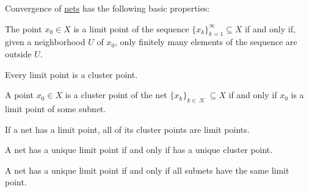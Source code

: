 \begin{proposition}\label{thm:net_convergence_properties}
  Convergence of \hyperref[def:net_convergence]{nets} has the following basic properties:

  \begin{thmenum}
     The point \( x_0 \in X \) is a limit point of the sequence \( \{ x_k \}_{k=1}^\infty \subseteq X \) if and only if, given a neighborhood \( U \) of \( x_0 \), only finitely many elements of the sequence are outside \( U \).

     Every limit point is a cluster point.

     A point \( x_0 \in X \) is a cluster point of the net \( \{ x_k \}_{k \in \mscrK} \subseteq X \) if and only if \( x_0 \) is a limit point of some subnet.

     If a net has a limit point, all of its cluster points are limit points.

     A net has a unique limit point if and only if has a unique cluster point.

     A net has a unique limit point if and only if all subnets have the same limit point.
  \end{thmenum}
\end{proposition}
